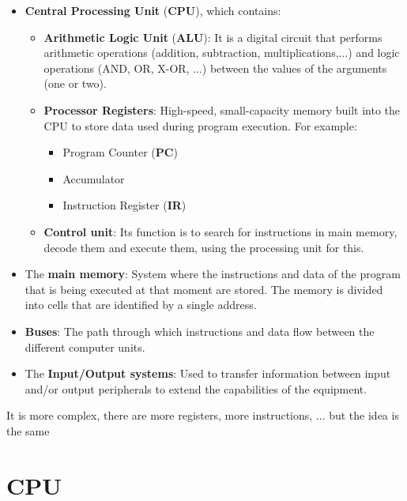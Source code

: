 \begin{itemize}
    \item \textbf{Central Processing Unit} (\textbf{CPU}), which contains:
    \begin{itemize}
        \item \textbf{Arithmetic Logic Unit} (\textbf{ALU}): It is a digital circuit that performs arithmetic operations (addition, subtraction, multiplications,...) and logic operations (AND, OR, X-OR, ...) between the values of the arguments (one or two).

        \item \textbf{Processor Registers}: High-speed, small-capacity memory built into the CPU to store data used during program execution. For example:
        \begin{itemize}
            \item Program Counter (\textbf{PC})
            \item Accumulator
            \item Instruction Register (\textbf{IR})
        \end{itemize}
        \item \textbf{Control unit}: Its function is to search for instructions in main memory, decode them and execute them, using the processing unit for this.
    \end{itemize}
    \item The \textbf{main memory}: System where the instructions and data of the program that is being executed at that moment are stored. The memory is divided into cells that are identified by a single address.

    \item \textbf{Buses}: The path through which instructions and data flow between the different computer units.

    \item The \textbf{Input/Output systems}: Used to transfer  information between input and/or output peripherals to extend the capabilities of the equipment.
\end{itemize}

It is more complex, there are more registers, more instructions, ... but the idea is the same




\section{CPU}

